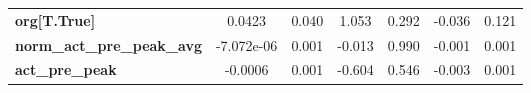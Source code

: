 \begin{center}
\begin{tabular}{lcccccc}
\textbf{org[T.True]}               &       0.0423  &        0.040     &     1.053  &         0.292        &       -0.036    &        0.121     \\
\textbf{norm\_act\_pre\_peak\_avg} &   -7.072e-06  &        0.001     &    -0.013  &         0.990        &       -0.001    &        0.001     \\
\textbf{act\_pre\_peak}            &      -0.0006  &        0.001     &    -0.604  &         0.546        &       -0.003    &        0.001     \\
\bottomrule
\end{tabular}
\end{center}